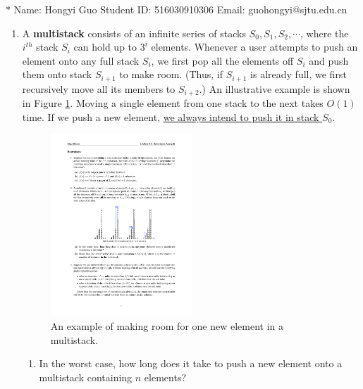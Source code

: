 \documentclass[12pt,a4paper]{article}
\theoremstyle{definition}
\begin{document}
\noindent

\noindent{}
\begin{center}

\footnotesize{\color{blue}$*$ Name: Hongyi Guo  \quad Student ID: 516030910306 \quad Email: guohongyi@sjtu.edu.cn}
\end{center}

\begin{enumerate}
\item A \textbf{multistack} consists of an infinite series of stacks $S_0, S_1, S_2,\cdots$, where the $i^{th}$ stack $S_i$ can hold up to $3^i$ elements. Whenever a user attempts to push an element onto any full stack $S_i$, we first pop all the elements off $S_i$ and push them onto stack $S_{i+1}$ to make room. (Thus, if $S_{i+1}$ is already full, we first recursively move all its members to $S_{i+2}$.) An illustrative example is shown in Figure \ref{Fig-MultiStack}. Moving a single element from one stack to the next takes $O(1)$ time. If we push a new element, \underline{we always intend to push it in stack $S_0$}.

\begin{figure}[!htbp]
\centering
\includegraphics[width=0.5\textwidth]{Fig-MultiStack.pdf}
\caption{An example of making room for one new element in a multistack.}
\label{Fig-MultiStack}
\end{figure}

    \begin{enumerate}
        \item In the worst case, how long does it take to push a new element onto a multistack containing $n$ elements?
        

\end{enumerate}
\end{enumerate}
\end{document}
